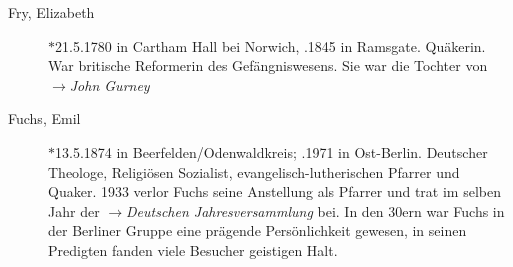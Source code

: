 \begin{description}
 \item[Fry, Elizabeth] $\ast$21.5.1780 in Cartham Hall bei Norwich,
 .1845 in Ramsgate. Quäkerin. War britische Reformerin des
 Gefängniswesens. Sie war die Tochter von $\to$\textit{John Gurney}

 \item[Fuchs, Emil] $\ast$13.5.1874 in Beerfelden/Odenwaldkreis; .1971
 in Ost-Berlin. Deutscher Theologe, Religiösen Sozialist,
 evangelisch-lutherischen Pfarrer und Quaker. 1933 verlor Fuchs seine
 Anstellung als Pfarrer und trat im selben Jahr der $\to$\textit{Deutschen
 Jahresversammlung} bei. In den 30ern war Fuchs in der Berliner Gruppe eine
 prägende Persönlichkeit gewesen, in seinen Predigten fanden viele Besucher
 geistigen Halt.


 \end{description}

\normalsize